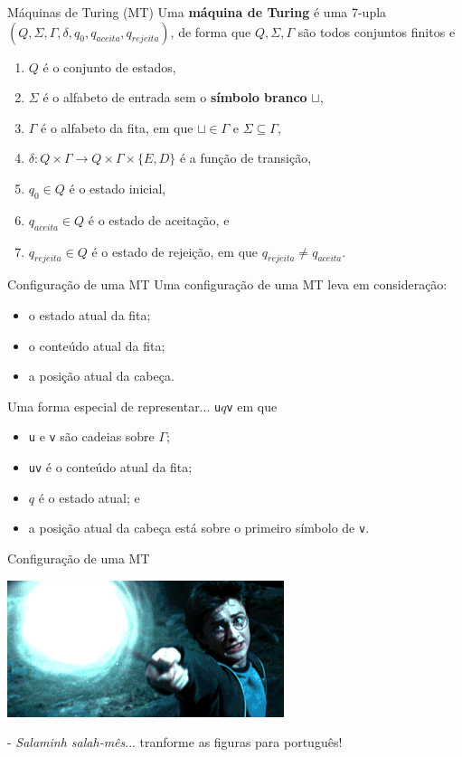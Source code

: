 \documentclass[xcolor=dvipsnames,table]{beamer}
\begin{document}
	\begin{frame}{Máquinas de Turing (MT)}
		Uma {\bf máquina de Turing} é uma 7-upla $(Q, \Sigma, \Gamma, \delta, q_0, q_{aceita}, q_{rejeita})$, de forma que $Q, \Sigma, \Gamma$ são todos conjuntos finitos e

		\begin{enumerate}
			\item $Q$ é o conjunto de estados,
			\item $\Sigma$ é o alfabeto de entrada sem o {\bf símbolo branco} $\sqcup$,
			\item $\Gamma$ é o alfabeto da fita, em que $\sqcup \in \Gamma$ e $\Sigma \subseteq \Gamma$,
			\item $\delta : Q \times \Gamma \rightarrow Q \times \Gamma \times \{E, D\}$ é a função de transição,
			\item $q_0 \in Q$ é o estado inicial,
			\item $q_{aceita} \in Q$ é o estado de aceitação, e
			\item $q_{rejeita} \in Q$ é o estado de rejeição, em que $q_{rejeita} \not= q_{aceita}$.
		\end{enumerate}
	\end{frame}
	
	\begin{frame}{Configuração de uma MT}
		Uma configuração de uma MT leva em consideração:
		\begin{itemize}
			\item o estado atual da fita;
			\item o conteúdo atual da fita;
			\item a posição atual da cabeça.
		\end{itemize}\pause
		\begin{block}{Uma forma especial de representar...}
			{\tt u}$q${\tt v} em que
			\begin{itemize}
				\item {\tt u} e {\tt v} são cadeias sobre $\Gamma$;
				\item {\tt uv} é o conteúdo atual da fita;
				\item $q$ é o estado atual; e
				\item a posição atual da cabeça está sobre o primeiro símbolo de {\tt v}.
			\end{itemize}
		\end{block}
	\end{frame}
	
	\begin{frame}{Configuração de uma MT}
		\begin{center}
			\includegraphics[height=4cm]{images/harry.png}
			
			- {\it Salaminh salah-mês}... tranforme as figuras para português!
		\end{center}
	\end{frame}	
	
\end{document}
